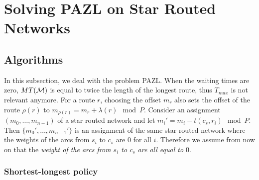 \documentclass[10pt, conference, letterpaper]{IEEEtran}
\begin{document}
%
%      
%      
%
%      
%      
%
    
\section{Solving PAZL on Star Routed Networks} \label{sec:PAZL}
  
   
  \subsection{Algorithms}
  
  In this subsection, we deal with the problem PAZL.  
  When the waiting times are zero, $MT({\cal M})$ is equal to twice the length of the longest route, thus $T_{max}$ is not relevant anymore. For a route $r$, choosing the offset $m_r$ also sets the offset of the route $\rho(r)$ to $m_{\rho(r)} = m_{r} + \lambda(r) \mod P$.
  Consider an assignment $(m_0,\dots,m_{n-1})$ of a star routed network and let $m_i'= m_{i} - t(c_s,r_i) \mod P$.
  Then $\{m_0',\dots,m_{n-1}'\}$ is an assignment of the same star routed network where the weights of the arcs from $s_i$ to $c_s$ are $0$ for all $i$. Therefore we assume from now on that the \emph{weight of the arcs from $s_i$ to $c_s$ are all equal to $0$}.
  
 
    \subsubsection*{Shortest-longest policy}
    
\end{document}
